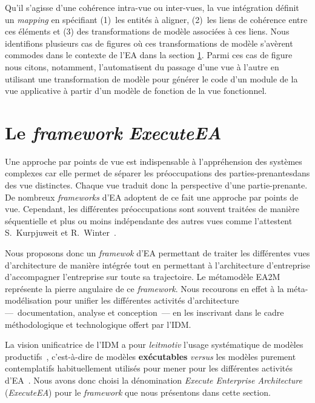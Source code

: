 Qu'il s’agisse d'une cohérence intra-vue ou inter-vues, la vue intégration définit un \textit{mapping} en spécifiant
(1)~les entités à aligner, (2)~les liens de cohérence entre ces éléments et (3) des transformations de modèle
associées à ces liens. Nous identifions plusieurs cas de figures où ces transformations de modèle s'avèrent commodes
dans le contexte de l'EA dans la section \ref{sec:executeea}. Parmi ces cas de figure nous citons, notamment,
l'automatisent du passage d'une vue à l'autre en utilisant une transformation de modèle pour générer le code
d'un module de la vue applicative à partir d'un modèle de fonction de la vue fonctionnel.

\section[Le framework ExecuteEA]{Le \emph{framework} \emph{ExecuteEA}}
\label{sec:executeea}
    

    Une approche par points de vue est indispensable à l’appréhension des systèmes complexes car elle permet de séparer
    les préoccupations des parties-prenantesdans des vue distinctes. Chaque vue traduit donc la perspective d'une partie-prenante.
    De nombreux \emph{frameworks} d'EA adoptent de ce fait une approche par points de vue. Cependant, les différentes préoccupations
    sont souvent traitées de manière séquentielle et plus ou moins indépendante des autres vues comme l'attestent
    S.~Kurpjuweit et R.~Winter~\cite{kurpjuweit2007viewpoint}.

    Nous proposons donc un \emph{framewok} d'EA permettant de traiter
    les différentes vues d'architecture de manière intégrée tout en permettant à l'architecture d'entreprise d'accompagner l'entreprise
    sur toute sa trajectoire.  Le métamodèle EA2M représente la pierre angulaire de ce \emph{framework}.
    Nous recourons en effet à la méta-modélisation pour unifier les différentes activités
    d'architecture —~documentation, analyse et conception~—
    en les inscrivant dans le cadre méthodologique et technologique offert par l'IDM.

    La vision unificatrice de l'IDM a pour \emph{leitmotiv} l'usage systématique de modèles productifs~\cite{2005unification}, c'est-à-dire
    de modèles \textbf{exécutables} \emph{versus} les modèles purement contemplatifs habituellement utilisés pour mener 
    pour les différentes activités d'EA~\cite{kulkarni2013modelling}. Nous avons donc choisi la dénomination \emph{Execute Enterprise Architecture} (\emph{ExecuteEA}) pour le \emph{framework} que nous présentons dans cette section.

